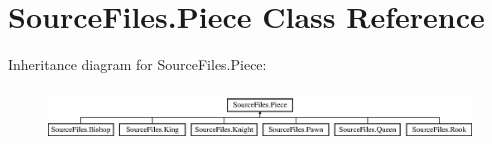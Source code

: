 \hypertarget{class_source_files_1_1_piece}{}\section{Source\+Files.\+Piece Class Reference}
\label{class_source_files_1_1_piece}
Inheritance diagram for Source\+Files.\+Piece\+:\begin{figure}[H]
\begin{center}
\leavevmode
\includegraphics[height=1.435897cm]{class_source_files_1_1_piece}
\end{center}
\end{figure}

